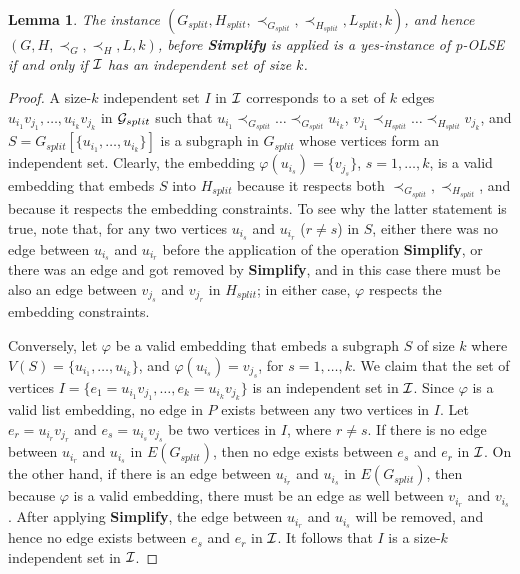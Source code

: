 \documentclass[11pt]{article}
\newtheorem{lemma}[theorem]{Lemma}
\let\phi=\varphi
\begin{document}
\begin{lemma}
\label{lem:equivalence}
The instance $(G_{split}, H_{split}, \prec_{G_{split}}, \prec_{H_{split}}, L_{split}, k)$, and hence \\ $(G, H, \prec_G, \prec_H, L, k)$, before {\bf Simplify} is applied is a yes-instance of p-OLSE if and only if ${\cal I}$ has an independent set of size $k$.
\end{lemma}

\begin{proof}
A size-$k$ independent set $I$ in ${\cal I}$ corresponds to a set of $k$ edges $u_{i_1}v_{j_1}, \ldots, u_{i_k}v_{j_k}$ in ${\cal G}_{split}$ such that $u_{i_1} \prec_{G_{split}} \ldots \prec_{G_{split}} u_{i_k}$,
$v_{j_1} \prec_{H_{split}} \ldots \prec_{H_{split}} v_{j_k}$, and $S=G_{split}[\{u_{i_1}, \ldots, u_{i_k}\}]$ is a subgraph in $G_{split}$ whose vertices form an independent set. Clearly, the embedding $\phi(u_{i_s}) = \{v_{j_s}\}$, $s=1, \ldots, k$, is a valid embedding that embeds $S$ into $H_{split}$ because it respects both $\prec_{G_{split}}, \prec_{H_{split}}$, and because it respects the embedding constraints. To see why the latter statement is true, note that, for any two vertices $u_{i_s}$ and $u_{i_r}$ ($r \neq s$) in $S$, either there was no edge between $u_{i_s}$ and $u_{i_r}$ before the application of the operation {\bf Simplify}, or there was an edge and got removed by {\bf Simplify}, and in this case there must be also an edge between $v_{j_s}$ and $v_{j_r}$ in $H_{split}$; in either case, $\phi$ respects the embedding constraints.

Conversely, let $\phi$ be a valid embedding that embeds a subgraph $S$ of size $k$ where $V(S)=\{u_{i_1}, \ldots, u_{i_k}\}$, and $\phi(u_{i_s}) = v_{j_s}$, for $s=1, \ldots, k$. We claim that the set of vertices $I=\{e_1=u_{i_1}v_{j_1}, \ldots, e_k=u_{i_k}v_{j_k}\}$ is an independent set in ${\cal I}$. Since $\phi$ is a valid list embedding, no edge in $P$ exists between any two vertices in $I$. Let $e_r=u_{i_r}v_{j_r}$ and $e_s=u_{i_s}v_{j_s}$ be two vertices in $I$, where $r\neq s$. If there is no edge between $u_{i_r}$ and $u_{i_s}$ in $E(G_{split})$, then no edge exists between $e_s$ and $e_r$ in ${\cal I}$. On the other hand, if there is an edge between $u_{i_r}$ and $u_{i_s}$ in $E(G_{split})$, then because $\phi$ is a valid embedding, there must be an edge as well between $v_{i_r}$ and $v_{i_s}$. After applying {\bf Simplify}, the edge between $u_{i_r}$ and $u_{i_s}$ will be removed, and hence no edge exists between $e_s$ and $e_r$ in ${\cal I}$. It follows that $I$ is a size-$k$ independent set in ${\cal I}$.\end{proof}
\end{document}
